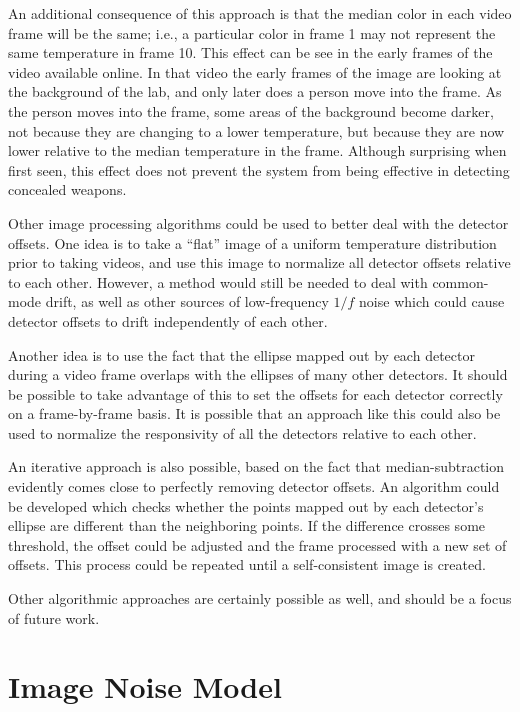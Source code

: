 An additional consequence of this approach is that the median color in each video frame will be the same; i.e., a particular color in frame 1 may not represent the same temperature in frame 10.
This effect can be see in the early frames of the video available online.
In that video the early frames of the image are looking at the background of the lab, and only later does a person move into the frame.
As the person moves into the frame, some areas of the background become darker, not because they are changing to a lower temperature, but because they are now lower relative to the median temperature in the frame.
Although surprising when first seen, this effect does not prevent the system from being effective in detecting concealed weapons.

Other image processing algorithms could be used to better deal with the detector offsets.
One idea is to take a ``flat'' image of a uniform temperature distribution prior to taking videos, and use this image to normalize all detector offsets relative to each other.
However, a method would still be needed to deal with common-mode drift, as well as other sources of low-frequency $1/f$ noise which could cause detector offsets to drift independently of each other.

Another idea is to use the fact that the ellipse mapped out by each detector during a video frame overlaps with the ellipses of many other detectors.
It should be possible to take advantage of this to set the offsets for each detector correctly on a frame-by-frame basis.
It is possible that an approach like this could also be used to normalize the responsivity of all the detectors relative to each other.

An iterative approach is also possible, based on the fact that median-subtraction evidently comes close to perfectly removing detector offsets.
An algorithm could be developed which checks whether the points mapped out by each detector's ellipse are different than the neighboring points.
If the difference crosses some threshold, the offset could be adjusted and the frame processed with a new set of offsets.
This process could be repeated until a self-consistent image is created.

Other algorithmic approaches are certainly possible as well, and should be a focus of future work.

\section{Image Noise Model}\label{sec:ch8-noise-model}



